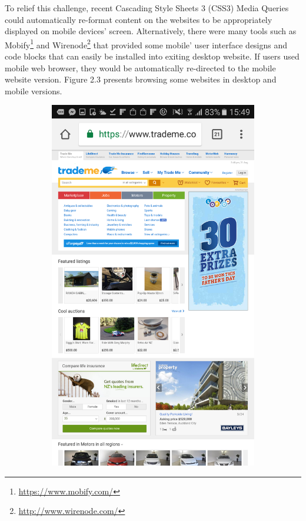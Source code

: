 To relief this challenge, recent Cascading Style Sheets 3 (CSS3) Media Queries could automatically re-format content on the websites to be appropriately displayed on mobile devices' screen. Alternatively, there were many tools such as Mobify\footnote{\url{https://www.mobify.com/}} and Wirenode\footnote{\url{http://www.wirenode.com/}} that provided some mobile' user interface designs and code blocks that can easily be installed into exiting desktop website. If users used mobile web browser, they would be automatically re-directed to the mobile website version. Figure 2.3 presents browsing some websites in desktop and mobile versions. 
\begin{figure}[!hbt]\centering
    \begin{subfigure}{0.25\textwidth}
 \includegraphics[width=\textwidth]{cha1}

\end{subfigure}
\end{figure}
